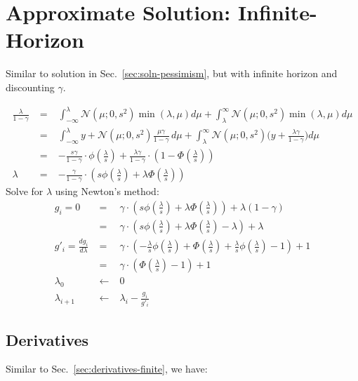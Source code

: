 \documentclass[a4paper,10pt]{article}
\newcommand{\pdff}{\phi(\tfrac{\lambda}{s})}
\newcommand{\cdff}{\Phi(\tfrac{\lambda}{s})}
\newcommand{\N}{\mathcal{N}}
\begin{document}
\section{Approximate Solution: Infinite-Horizon}

Similar to solution in Sec.~\ref{sec:soln-pessimism}, but with infinite horizon and discounting $\gamma$.

\begin{eqnarray}
 \frac{\lambda}{1-\gamma}
 &\;=\;& \int_{-\infty}^{\lambda} \N(\mu;0,s^2)\min(\lambda,\mu)d\mu + \int_{\lambda}^{\infty} \N(\mu;0,s^2)\min(\lambda,\mu)d\mu\\
 &\;=\;& \int_{-\infty}^{\lambda} y+\N(\mu;0,s^2)\frac{\mu\gamma}{1-\gamma} \, d\mu + \int_{\lambda}^{\infty} \N(\mu;0,s^2) \big( y + \frac{\lambda\gamma}{1-\gamma} \big) d\mu \nonumber\\
 &\;=\;& -\frac{s\gamma}{1-\gamma}\cdot\pdff + \frac{\lambda\gamma}{1-\gamma}\cdot(1-\cdff)  \\
 \lambda &\;=\;& -\frac{\gamma}{1-\gamma}\cdot(s\pdff +\lambda\cdff)
\end{eqnarray} 
%
Solve for $\lambda$ using Newton's method:
%
\begin{eqnarray}
 g_i =0 &\;=\;& \gamma\cdot(s\pdff +\lambda\cdff) + \lambda(1-\gamma) \\
        &\;=\;& \gamma\cdot(s\pdff +\lambda\cdff-\lambda) + \lambda \\
 g'_i = \frac{dg_i}{d\lambda} &\;=\;& \gamma\cdot(-\tfrac{\lambda}{s}\pdff +\cdff +\tfrac{\lambda}{s}\pdff-1) + 1 \\
                     &\;=\;& \gamma\cdot(\cdff-1)+1\\
 \lambda_0 &\;\leftarrow\;& 0 \\
 \lambda_{i+1} &\;\leftarrow\;& \lambda_i - \frac{g_i}{g'_i}
\end{eqnarray}

\subsection{Derivatives}

Similar to Sec.~\ref{sec:derivatives-finite}, we have:
\end{document}
